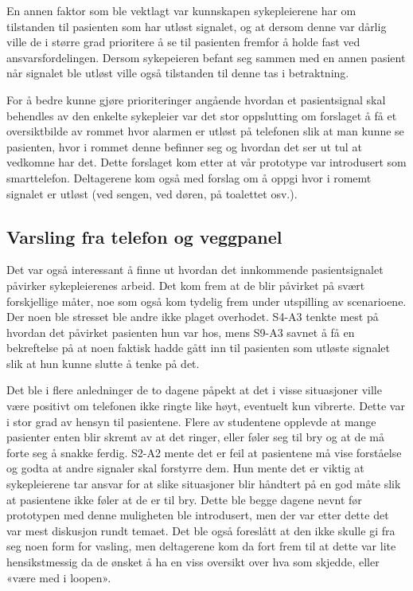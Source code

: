 \noindent
En annen faktor som ble vektlagt var kunnskapen sykepleierene har om tilstanden til pasienten som har utløst signalet, og at dersom denne var dårlig ville de i større grad prioritere å se til pasienten fremfor å holde fast ved ansvarsfordelingen. 
Dersom sykepeieren befant seg sammen med en annen pasient når signalet ble utløst ville også tilstanden til denne tas i betraktning. 

\noindent
For å bedre kunne gjøre prioriteringer angående hvordan et pasientsignal skal behendles av den enkelte sykepleier var det stor oppslutting om forslaget å få et oversiktbilde av rommet hvor alarmen er utløst på telefonen slik at man kunne se pasienten, hvor i rommet denne befinner seg og hvordan det ser ut tul at vedkomne har det. Dette forslaget kom etter at vår prototype var introdusert som smarttelefon. Deltagerene kom også med forslag om å oppgi hvor i romemt signalet er utløst (ved sengen, ved døren, på toalettet osv.).

\subsection{Varsling fra telefon og veggpanel}

Det var også interessant å finne ut hvordan det innkommende pasientsignalet påvirker sykepleierenes arbeid. Det kom frem at de blir påvirket på svært forskjellige måter, noe som også kom tydelig frem under utspilling av scenarioene.
Der noen ble stresset ble andre ikke plaget overhodet. S4-A3 tenkte mest på hvordan det påvirket pasienten hun var hos, mens S9-A3 savnet å få en bekreftelse på at noen faktisk hadde gått inn til pasienten som utløste signalet slik at hun kunne slutte å tenke på det. 

\noindent
Det ble i flere anledninger de to dagene påpekt at det i visse situasjoner ville være positivt om telefonen ikke ringte like høyt, eventuelt kun vibrerte.
Dette var i stor grad av hensyn til pasientene. Flere av studentene opplevde at mange pasienter enten blir skremt av at det ringer, eller føler seg til bry og at de må forte seg å snakke ferdig. 
S2-A2 mente det er feil at pasientene må vise forståelse og godta at andre signaler skal forstyrre dem. Hun mente det er viktig at sykepleierene tar ansvar for at slike situasjoner blir håndtert på en god måte slik at pasientene ikke føler at de er til bry.
Dette ble begge dagene nevnt før prototypen med denne muligheten ble introdusert, men der var etter dette det var mest diskusjon rundt temaet. 
Det ble også foreslått at den ikke skulle gi fra seg noen form for vasling, men deltagerene kom da fort frem til at dette var lite hensikstmessig da de ønsket å ha en viss oversikt over hva som skjedde, eller «være med i loopen».

